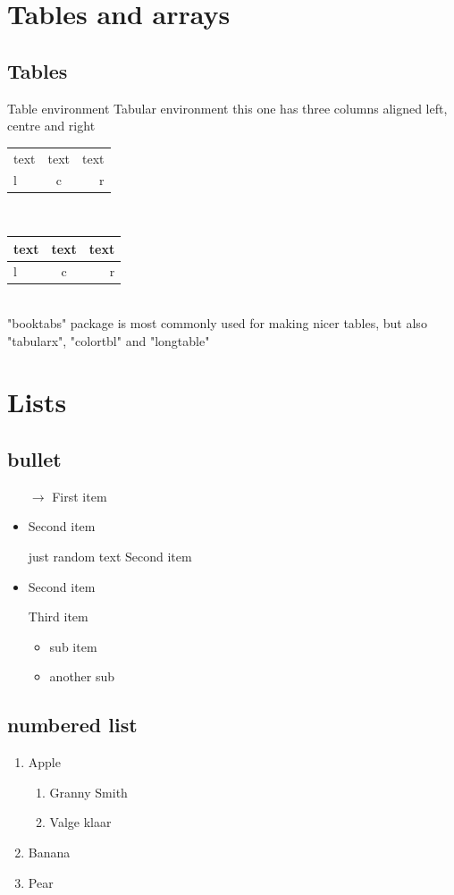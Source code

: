 \documentclass[16pt,a4paper]{article}
\begin{document}
\section{Tables and arrays}
\subsection{Tables}
Table environment Tabular environment
this one has three columns aligned left, centre and right\\
\begin{tabular}{lcr}
    text    & text  & text \\
    l   & c & r
\end{tabular}\\
\begin{tabular}{|||l|c|r|}
    \hline
    text    & text  & text \\
    \hline
    \hline
    l   & c & r \\
    \hline
\end{tabular}\\
    "booktabs" package is most commonly used for making nicer tables, but also "tabularx", "colortbl" and "longtable"

\section{Lists}
\subsection{bullet}
\begin{itemize}
    \item [$\rightarrow$] First item
    \item Second item
    \item [just random text] Second item
    \item Second item
    \item [] Third item
    \begin{itemize}
        \item sub item
        \item another sub
    \end{itemize}
\end{itemize}
\subsection{numbered list}
\begin{enumerate}
    \item Apple
    \begin{enumerate}
        \item Granny Smith
        \item Valge klaar
    \end{enumerate}
    \item Banana
    \item Pear
\end{enumerate}
\end{document}
